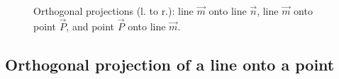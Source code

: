 \documentclass{birkjour}
\begin{document}
 \begin{figure}
  \centering
{\setlength\fboxsep{0pt}}\hspace{.02in}
{\setlength\fboxsep{0pt}}\hspace{.02in}
{\setlength\fboxsep{0pt}}
\caption{Orthogonal projections (l. to r.): line $\vec{m}$ onto line $\vec{n}$,  line $\vec{m}$ onto point $\vec{P}$, and point  $\vec{P}$  onto line $\vec{m}$.}
\label{fig:orthProj}
\end{figure}



\subsection{Orthogonal projection of a line onto a point}
\end{document}
